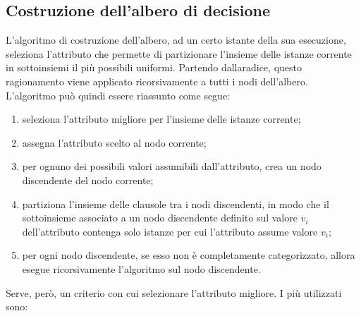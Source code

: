 \subsection{Costruzione dell'albero di decisione}
L'algoritmo di costruzione dell'albero, ad un certo istante della sua
esecuzione, seleziona l'attributo che permette di partizionare l'insieme delle
istanze corrente in sottoinsiemi il più possibili uniformi.
Partendo dallaradice, questo ragionamento viene applicato ricorsivamente a
tutti i nodi dell'albero.
L'algoritmo può quindi essere riassunto come segue:
\begin{enumerate}
    \item seleziona l'attributo migliore per l'insieme delle istanze corrente;
    \item assegna l'attributo scelto al nodo corrente;
    \item per ognuno dei possibili valori assumibili dall'attributo,
    crea un nodo discendente del nodo corrente;
    \item partiziona l'insieme delle clausole tra i nodi discendenti,
    in modo che il sottoinsieme associato a un nodo discendente definito sul
    valore $v_i$ dell'attributo contenga solo istanze per cui l'attributo assume
    valore $v_i$;
    \item per ogni nodo discendente, se esso non è completamente categorizzato,
    allora esegue ricorsivamente l'algoritmo sul nodo discendente.
\end{enumerate}
Serve, però, un criterio con cui selezionare l'attributo migliore.
I più utilizzati sono:

